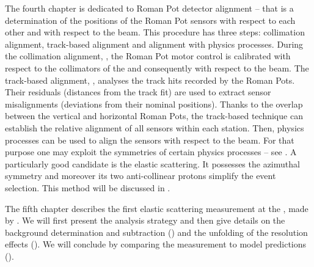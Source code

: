 The fourth chapter is dedicated to Roman Pot detector alignment -- that is a determination of the positions of the Roman Pot sensors with respect to each other and with respect to the beam. This procedure has three steps: collimation alignment, track-based alignment and alignment with physics processes. During the collimation alignment, , the Roman Pot motor control is calibrated with respect to the collimators of the  and consequently with respect to the beam. The track-based alignment, , analyses the track hits recorded by the Roman Pots. Their residuals (distances from the track fit) are used to extract sensor misalignments (deviations from their nominal positions). Thanks to the overlap between the vertical and horizontal Roman Pots, the track-based technique can establish the relative alignment of all sensors within each station. Then, physics processes can be used to align the sensors with respect to the beam. For that purpose one may exploit the symmetries of certain physics processes -- see . A particularly good candidate is the elastic scattering. It possesses the azimuthal symmetry and moreover its two anti-collinear protons
simplify the event selection. This method will be discussed in .

The fifth chapter describes the first elastic scattering measurement at the , made by . We will first present the analysis strategy and then give details on the background determination and subtraction () and the unfolding of the resolution effects (). We will conclude by comparing the measurement to model predictions ().




\def\CaptionPrefix{\currentChapterNumber.}
